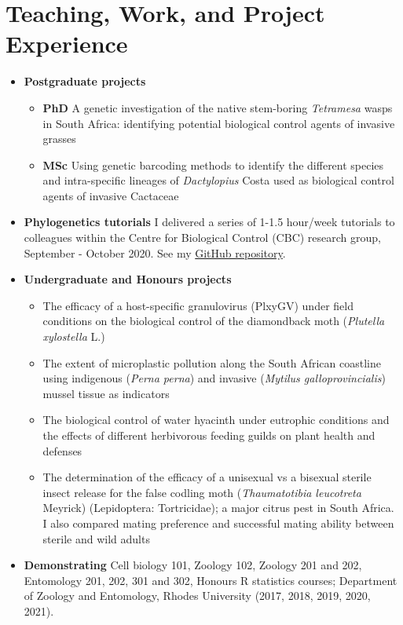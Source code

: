 \documentclass{article}
\begin{document}
\section{Teaching, Work, and Project Experience}
\begin{itemize}

\item \textbf{Postgraduate projects}
\begin{itemize}
    \item \textbf{PhD} A genetic investigation of the native stem-boring \textit{Tetramesa} wasps in South Africa: identifying potential biological control agents of invasive grasses
    \item \textbf{MSc} Using genetic barcoding methods to identify the different species and intra-specific lineages of \textit{Dactylopius} Costa used as biological control agents of invasive Cactaceae
\end{itemize}
\item \textbf{Phylogenetics tutorials}
I delivered a series of 1-1.5 hour/week tutorials to colleagues within the Centre for Biological Control (CBC) research group, September - October 2020. See my \href{https://github.com/CJMvS/CBC_Tutorials}{GitHub repository}.
\item \textbf{Undergraduate and Honours projects}
\begin{itemize}
    \item The efficacy of a host-specific granulovirus (PlxyGV) under field conditions on the biological control of the diamondback moth (\textit{Plutella xylostella} L.)
    \item The extent of microplastic pollution along the South African coastline using indigenous (\textit{Perna perna}) and invasive (\textit{Mytilus galloprovincialis}) mussel tissue as indicators
    \item The biological control of water hyacinth under eutrophic conditions and the effects of different herbivorous feeding guilds on plant health and defenses
    \item The determination of the efficacy of a unisexual vs a bisexual sterile insect release for the false codling moth (\textit{Thaumatotibia leucotreta} Meyrick) (Lepidoptera: Tortricidae); a major citrus pest in South Africa. I also compared mating preference and successful mating ability between sterile and wild adults
\end{itemize}
\item \textbf{Demonstrating} 
Cell biology 101, Zoology 102, Zoology 201 and 202, Entomology 201, 202, 301 and 302, Honours R statistics courses; Department of Zoology and Entomology, Rhodes University (2017, 2018, 2019, 2020, 2021).

\end{itemize}
\end{document}
